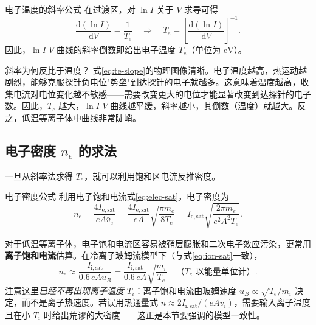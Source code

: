 \documentclass[12pt,a4paper,openany,oneside]{book}
\newcommand{\diff}{\mathrm{d}}
\begin{document}
\begin{corollary}{电子温度的斜率公式}{}{}
在过渡区，对 $\ln I$ 关于 $V$ 求导可得
\begin{equation}
\frac{\diff (\ln I)}{\diff V} = \frac{1}{T_e}
\quad\Longrightarrow\quad
T_e = \left[\frac{\diff (\ln I)}{\diff V}\right]^{-1}.
\label{eq:te-slope}
\end{equation}
因此，$\ln I$-$V$ 曲线的斜率倒数即给出电子温度 $T_e$（单位为 $\mathrm{eV}$）。
\end{corollary}

\begin{insight}{斜率为何反比于温度？}{}
式\eqref{eq:te-slope}的物理图像清晰。电子温度越高，热运动越剧烈，能够克服探针负电位"势垒"到达探针的电子就越多。这意味着温度越高，收集电流对电位变化越不敏感——需要改变更大的电位才能显著改变到达探针的电子数。因此，$T_e$ 越大，$\ln I$-$V$ 曲线越平缓，斜率越小，其倒数（温度）就越大。反之，低温等离子体中曲线非常陡峭。
\end{insight}

\subsection{电子密度 $n_e$ 的求法}

一旦从斜率法求得 $T_e$，就可以利用饱和区电流反推密度。

\begin{corollary}{电子密度公式}{}{}
利用电子饱和电流式\eqref{eq:elec-sat}，电子密度为
\begin{equation}
n_e = \frac{4 I_{\mathrm{e,sat}}}{e A \bar{v}_e}
= \frac{4 I_{\mathrm{e,sat}}}{e A}\sqrt{\frac{\pi m_e}{8 T_e}}
= I_{\mathrm{e,sat}} \sqrt{\frac{2\pi m_e}{e^2 A^2 T_e}}.
\label{eq:ne-from-sat}
\end{equation}

对于低温等离子体，电子饱和电流区容易被鞘层膨胀和二次电子效应污染，更常用\textbf{离子饱和电流}估算。在冷离子玻姆流模型下（与式\eqref{eq:ion-sat}一致），
\begin{equation}
n_e \approx \frac{I_{\mathrm{i,sat}}}{0.6\, e A u_B}
= \frac{I_{\mathrm{i,sat}}}{0.6\, e A}\sqrt{\frac{m_i}{T_e}}
\quad \text{（$T_e$ 以能量单位计）}.
\label{eq:ne-from-ion-sat}
\end{equation}
注意这里\emph{已经不再出现离子温度 $T_i$}：离子饱和电流由玻姆速度 $u_B\propto\sqrt{T_e/m_i}$ 决定，而不是离子热速度。若误用热通量式 $n\approx 2I_{\mathrm{i,sat}}/(eA\bar v_i)$，需要输入离子温度且在小 $T_i$ 时给出荒谬的大密度——这正是本节要强调的模型一致性。
\end{corollary}
\end{document}
